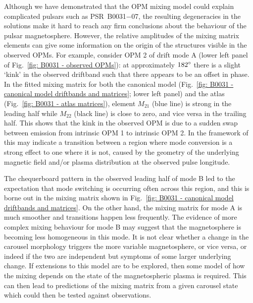 Although we have demonstrated that the OPM mixing model could explain complicated pulsars such as PSR~B0031$-$07, the resulting degeneracies in the solutions make it hard to reach any firm conclusions about the behaviour of the pulsar magnetosphere. However, the relative amplitudes of the mixing matrix elements can give some information on the origin of the structures visible in the observed OPMs. For example, consider OPM 2 of drift mode A (lower left panel of Fig.~\ref{fig: B0031 - observed OPMs}): at approximately $182^\circ$ there is a slight `kink' in the observed driftband such that there appears to be an offset in phase. In the fitted mixing matrix for both the canonical model (Fig.~\ref{fig: B0031 - canonical model driftbands and matrices}; lower left panel) and the atlas (Fig.~\ref{fig: B0031 - atlas matrices}), element $M_{21}$ (blue line) is strong in the leading half while $M_{22}$ (black line) is close to zero, and vice versa in the trailing half. This shows that the kink in the observed OPM is due to a sudden swap between emission from intrinsic OPM 1 to intrinsic OPM 2. In the framework of \citet{Pxxx2000} this may indicate a transition between a region where mode conversion is a strong effect to one where it is not, caused by the geometry of the underlying magnetic field and/or plasma distribution at the observed pulse longitude. 


The chequerboard pattern in the observed leading half of mode B led to the expectation that mode switching is occurring often across this region, and this is borne out in the mixing matrix shown in Fig.~\ref{fig: B0031 - canonical model driftbands and matrices}. On the other hand, the mixing matrix for mode A is much smoother and transitions happen less frequently. The evidence of more complex mixing behaviour for mode B may suggest that the magnetosphere is becoming less homogeneous in this mode. It is not clear whether a change in the carousel morphology triggers the more variable magnetosphere, or vice versa, or indeed if the two are independent but symptoms of some larger underlying change. If extensions to this model are to be explored, then some model of how the mixing depends on the state of the magnetospheric plasma is required. This can then lead to predictions of the mixing matrix from a given carousel state which could then be tested against observations.





